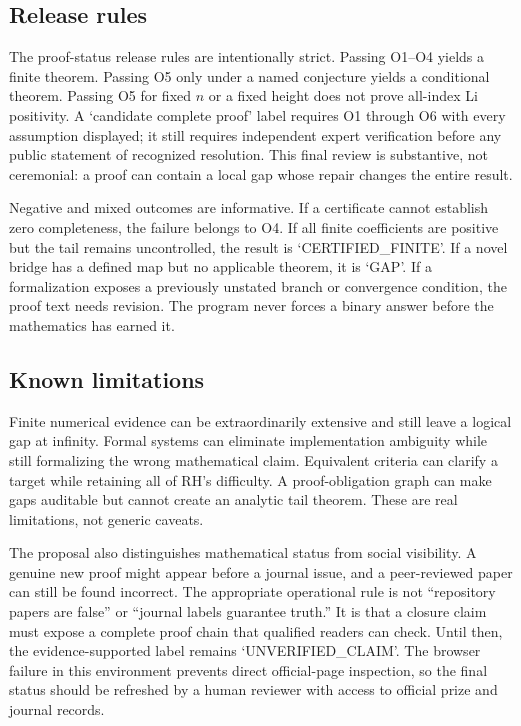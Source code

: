 \documentclass[conference]{../../../../Conference-LaTeX-template_10-17-19/IEEEtran}
\begin{document}
\subsection{Release rules}
The proof-status release rules are intentionally strict. Passing O1--O4 yields a finite theorem. Passing O5 only under a named conjecture yields a conditional theorem. Passing O5 for fixed $n$ or a fixed height does not prove all-index Li positivity. A `candidate complete proof' label requires O1 through O6 with every assumption displayed; it still requires independent expert verification before any public statement of recognized resolution. This final review is substantive, not ceremonial: a proof can contain a local gap whose repair changes the entire result.

Negative and mixed outcomes are informative. If a certificate cannot establish zero completeness, the failure belongs to O4. If all finite coefficients are positive but the tail remains uncontrolled, the result is `CERTIFIED\_FINITE'. If a novel bridge has a defined map but no applicable theorem, it is `GAP'. If a formalization exposes a previously unstated branch or convergence condition, the proof text needs revision. The program never forces a binary answer before the mathematics has earned it.

\subsection{Known limitations}
Finite numerical evidence can be extraordinarily extensive and still leave a logical gap at infinity. Formal systems can eliminate implementation ambiguity while still formalizing the wrong mathematical claim. Equivalent criteria can clarify a target while retaining all of RH's difficulty. A proof-obligation graph can make gaps auditable but cannot create an analytic tail theorem. These are real limitations, not generic caveats.

The proposal also distinguishes mathematical status from social visibility. A genuine new proof might appear before a journal issue, and a peer-reviewed paper can still be found incorrect. The appropriate operational rule is not ``repository papers are false'' or ``journal labels guarantee truth.'' It is that a closure claim must expose a complete proof chain that qualified readers can check. Until then, the evidence-supported label remains `UNVERIFIED\_CLAIM'. The browser failure in this environment prevents direct official-page inspection, so the final status should be refreshed by a human reviewer with access to official prize and journal records.
\end{document}
